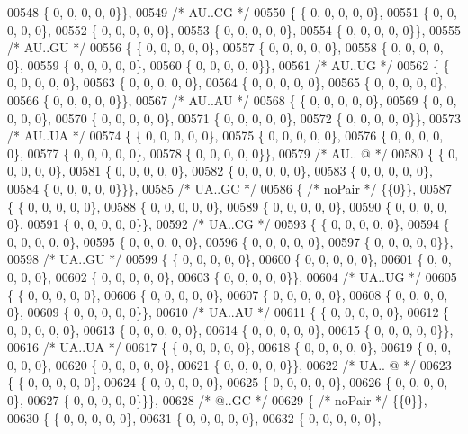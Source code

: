 \begin{DoxyCode}
00548 \{  0, 0, 0, 0, 0\}\},
00549  \textcolor{comment}{/* AU..CG */}
00550 \{ \{  0, 0, 0, 0, 0\},
00551 \{  0, 0, 0, 0, 0\},
00552 \{  0, 0, 0, 0, 0\},
00553 \{  0, 0, 0, 0, 0\},
00554 \{  0, 0, 0, 0, 0\}\},
00555  \textcolor{comment}{/* AU..GU */}
00556 \{ \{  0, 0, 0, 0, 0\},
00557 \{  0, 0, 0, 0, 0\},
00558 \{  0, 0, 0, 0, 0\},
00559 \{  0, 0, 0, 0, 0\},
00560 \{  0, 0, 0, 0, 0\}\},
00561  \textcolor{comment}{/* AU..UG */}
00562 \{ \{  0, 0, 0, 0, 0\},
00563 \{  0, 0, 0, 0, 0\},
00564 \{  0, 0, 0, 0, 0\},
00565 \{  0, 0, 0, 0, 0\},
00566 \{  0, 0, 0, 0, 0\}\},
00567  \textcolor{comment}{/* AU..AU */}
00568 \{ \{  0, 0, 0, 0, 0\},
00569 \{  0, 0, 0, 0, 0\},
00570 \{  0, 0, 0, 0, 0\},
00571 \{  0, 0, 0, 0, 0\},
00572 \{  0, 0, 0, 0, 0\}\},
00573  \textcolor{comment}{/* AU..UA */}
00574 \{ \{  0, 0, 0, 0, 0\},
00575 \{  0, 0, 0, 0, 0\},
00576 \{  0, 0, 0, 0, 0\},
00577 \{  0, 0, 0, 0, 0\},
00578 \{  0, 0, 0, 0, 0\}\},
00579  \textcolor{comment}{/* AU.. @ */}
00580 \{ \{  0, 0, 0, 0, 0\},
00581 \{  0, 0, 0, 0, 0\},
00582 \{  0, 0, 0, 0, 0\},
00583 \{  0, 0, 0, 0, 0\},
00584 \{  0, 0, 0, 0, 0\}\}\},
00585  \textcolor{comment}{/* UA..GC */}
00586 \{ \textcolor{comment}{/* noPair */} \{\{0\}\},
00587 \{ \{  0, 0, 0, 0, 0\},
00588 \{  0, 0, 0, 0, 0\},
00589 \{  0, 0, 0, 0, 0\},
00590 \{  0, 0, 0, 0, 0\},
00591 \{  0, 0, 0, 0, 0\}\},
00592  \textcolor{comment}{/* UA..CG */}
00593 \{ \{  0, 0, 0, 0, 0\},
00594 \{  0, 0, 0, 0, 0\},
00595 \{  0, 0, 0, 0, 0\},
00596 \{  0, 0, 0, 0, 0\},
00597 \{  0, 0, 0, 0, 0\}\},
00598  \textcolor{comment}{/* UA..GU */}
00599 \{ \{  0, 0, 0, 0, 0\},
00600 \{  0, 0, 0, 0, 0\},
00601 \{  0, 0, 0, 0, 0\},
00602 \{  0, 0, 0, 0, 0\},
00603 \{  0, 0, 0, 0, 0\}\},
00604  \textcolor{comment}{/* UA..UG */}
00605 \{ \{  0, 0, 0, 0, 0\},
00606 \{  0, 0, 0, 0, 0\},
00607 \{  0, 0, 0, 0, 0\},
00608 \{  0, 0, 0, 0, 0\},
00609 \{  0, 0, 0, 0, 0\}\},
00610  \textcolor{comment}{/* UA..AU */}
00611 \{ \{  0, 0, 0, 0, 0\},
00612 \{  0, 0, 0, 0, 0\},
00613 \{  0, 0, 0, 0, 0\},
00614 \{  0, 0, 0, 0, 0\},
00615 \{  0, 0, 0, 0, 0\}\},
00616  \textcolor{comment}{/* UA..UA */}
00617 \{ \{  0, 0, 0, 0, 0\},
00618 \{  0, 0, 0, 0, 0\},
00619 \{  0, 0, 0, 0, 0\},
00620 \{  0, 0, 0, 0, 0\},
00621 \{  0, 0, 0, 0, 0\}\},
00622  \textcolor{comment}{/* UA.. @ */}
00623 \{ \{  0, 0, 0, 0, 0\},
00624 \{  0, 0, 0, 0, 0\},
00625 \{  0, 0, 0, 0, 0\},
00626 \{  0, 0, 0, 0, 0\},
00627 \{  0, 0, 0, 0, 0\}\}\},
00628  \textcolor{comment}{/*  @..GC */}
00629 \{ \textcolor{comment}{/* noPair */} \{\{0\}\},
00630 \{ \{  0, 0, 0, 0, 0\},
00631 \{  0, 0, 0, 0, 0\},
00632 \{  0, 0, 0, 0, 0\},

\end{DoxyCode}

